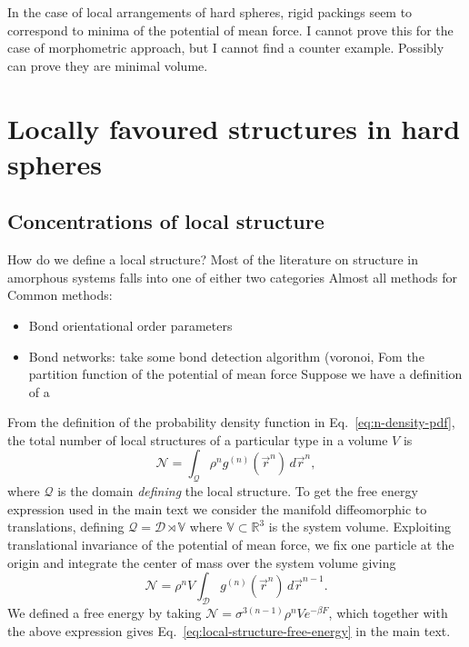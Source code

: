 \documentclass[11pt,twoside]{report}
\begin{document}
In the case of local arrangements of hard spheres, rigid packings seem to correspond to minima of the potential of mean force.
I cannot prove this for the case of morphometric approach, but I cannot find a counter example.
Possibly can prove they are minimal volume.

\section{Locally favoured structures in hard spheres}

\subsection{Concentrations of local structure}

How do we define a local structure?
Most of the literature on structure in amorphous systems falls into one of either two categories
Almost all methods for Common methods:
\begin{itemize}
  \item Bond orientational order parameters
  \item Bond networks: take some bond detection algorithm (voronoi, 
Fom the partition function of the potential of mean force
Suppose we have a definition of a
\end{itemize}

From the definition of the probability density function in Eq.\ \eqref{eq:n-density-pdf}, the total number of local structures of a particular type in a volume $V$ is
\begin{equation}\label{eq:structure-population}
  \mathcal{N} =
  \int_{\mathcal{Q}} \rho^n g^{(n)}(\vec{r}^n) \, d\vec{r}^n,
\end{equation}
where $\mathcal{Q}$ is the domain \emph{defining} the local structure.
To get the free energy expression used in the main text we consider the manifold diffeomorphic to translations, defining $\mathcal{Q} = \mathcal{D} \rtimes \mathbb{V}$ where $\mathbb{V}\subset \mathbb{R}^3$ is the system volume.
Exploiting translational invariance of the potential of mean force, we fix one particle at the origin and integrate the center of mass over the system volume giving
\begin{equation}
  \mathcal{N} =
  \rho^n V \int_{\mathcal{D}} g^{(n)}(\vec{r}^n) \, d\vec{r}^{n-1}.
\end{equation}
We defined a free energy by taking $\mathcal{N} = \sigma^{3(n-1)} \rho^n V e^{-\beta F}$, which together with the above expression gives Eq.\ \eqref{eq:local-structure-free-energy} in the main text.
\end{document}
